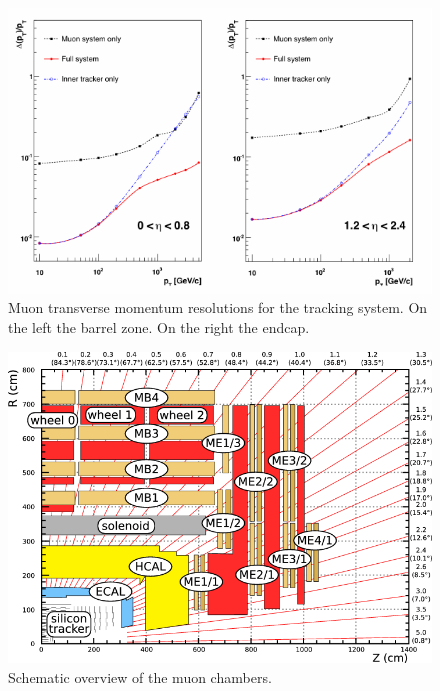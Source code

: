 \begin{figure}
\centering
\includegraphics[scale= 1.2]{../Cap2/muon_res}
\caption{Muon transverse momentum resolutions for the tracking system. On the left the barrel zone. On the right the endcap.}
\label{muon_res}
\end{figure}
\begin{figure}
\centering
\includegraphics[scale= 0.4]{../Cap2/muon}
\caption{Schematic overview of the muon chambers.}
\label{muon_c}
\end{figure}


